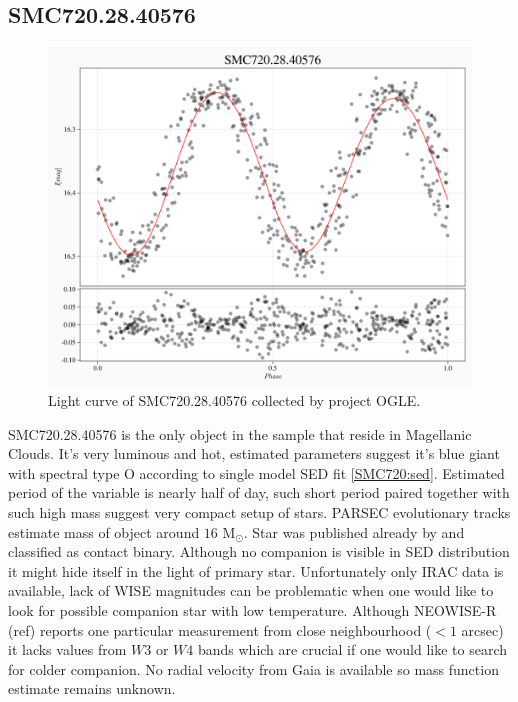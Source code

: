 \documentclass{pracalicmgr}
\begin{document}
\subsection{SMC720.28.40576}
\begin{figure}[H]
      \centering
      \includegraphics[scale=0.35]{plots/SMC720.28.40576_phase.png}
      \caption{Light curve of SMC720.28.40576 collected by project OGLE.}
      \label{SMC720:lc}
\end{figure}
SMC720.28.40576 is the only object in the sample that reside in Magellanic Clouds. It's very luminous and hot, 
estimated parameters suggest it's blue giant with spectral type O according to single model SED fit \ref{SMC720:sed}.
Estimated period of the variable is nearly half of day, such short period paired together with such high mass suggest very compact setup of stars.
PARSEC evolutionary tracks estimate mass of object around $16$  $\textrm{M}_{\odot}$. Star was published already by \citep{pawlak_ogle_2016} and classified as contact binary. Although
no companion is visible in SED distribution it might hide itself in the light of primary star.
Unfortunately only IRAC data is available, lack of WISE 
magnitudes can be problematic when one would like to look for possible companion star with low temperature.
Although NEOWISE-R (ref) reports one particular measurement from close neighbourhood ($<1$ arcsec) it lacks values from $W3$ or $W4$ bands
which are crucial if one would like to search for colder companion.
No radial velocity from Gaia is available so mass function estimate remains unknown.
\end{document}
